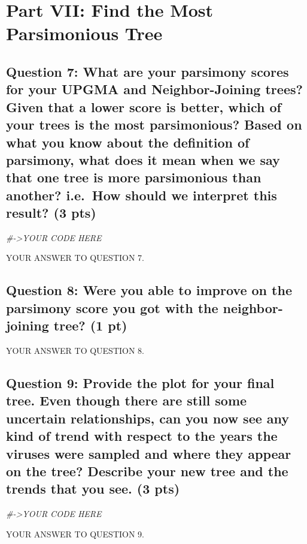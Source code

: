 \documentclass[
]{article}
\newenvironment{Shaded}{\begin{snugshade}}{\end{snugshade}}
\newcommand{\CommentTok}[1]{\textcolor[rgb]{0.56,0.35,0.01}{\textit{#1}}}
\begin{document}
\section{Part VII: Find the Most Parsimonious
Tree}\label{part-vii-find-the-most-parsimonious-tree}

\subsection{Question 7: What are your parsimony scores for your UPGMA
and Neighbor-Joining trees? Given that a lower score is better, which of
your trees is the most parsimonious? Based on what you know about the
definition of parsimony, what does it mean when we say that one tree is
more parsimonious than another? i.e.~How should we interpret this
result? (3
pts)}\label{question-7-what-are-your-parsimony-scores-for-your-upgma-and-neighbor-joining-trees-given-that-a-lower-score-is-better-which-of-your-trees-is-the-most-parsimonious-based-on-what-you-know-about-the-definition-of-parsimony-what-does-it-mean-when-we-say-that-one-tree-is-more-parsimonious-than-another-i.e.-how-should-we-interpret-this-result-3-pts}

\begin{Shaded}
\begin{Highlighting}[]
\CommentTok{\#{-}\textgreater{}YOUR CODE HERE}
\end{Highlighting}
\end{Shaded}

YOUR ANSWER TO QUESTION 7.

\subsection{Question 8: Were you able to improve on the parsimony score
you got with the neighbor-joining tree? (1
pt)}\label{question-8-were-you-able-to-improve-on-the-parsimony-score-you-got-with-the-neighbor-joining-tree-1-pt}

YOUR ANSWER TO QUESTION 8.

\subsection{Question 9: Provide the plot for your final tree. Even
though there are still some uncertain relationships, can you now see any
kind of trend with respect to the years the viruses were sampled and
where they appear on the tree? Describe your new tree and the trends
that you see. (3
pts)}\label{question-9-provide-the-plot-for-your-final-tree.-even-though-there-are-still-some-uncertain-relationships-can-you-now-see-any-kind-of-trend-with-respect-to-the-years-the-viruses-were-sampled-and-where-they-appear-on-the-tree-describe-your-new-tree-and-the-trends-that-you-see.-3-pts}

\begin{Shaded}
\begin{Highlighting}[]
\CommentTok{\#{-}\textgreater{}YOUR CODE HERE}
\end{Highlighting}
\end{Shaded}

YOUR ANSWER TO QUESTION 9.
\end{document}
